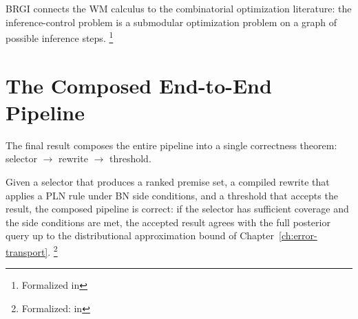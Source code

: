 \documentclass[11pt,openany]{report}
\begin{document}
\noindent
BRGI connects the WM calculus to the combinatorial optimization
literature: the inference-control problem is a submodular optimization
problem on a graph of possible inference steps.%
\footnote{Formalized in
}


\section{The Composed End-to-End Pipeline}
\label{sec:composed-pipeline}

The final result composes the entire pipeline into a single
correctness theorem: selector $\to$ rewrite $\to$ threshold.

\begin{theorem}
\label{thm:end-to-end}
Given a selector that produces a ranked premise set, a compiled
rewrite that applies a PLN rule under BN side conditions, and a
threshold that accepts the result, the composed pipeline is correct:
if the selector has sufficient coverage and the side conditions are
met, the accepted result agrees with the full posterior query up to
the distributional approximation bound of
Chapter~\ref{ch:error-transport}.%
\footnote{Formalized:
in }
\end{theorem}
\end{document}
